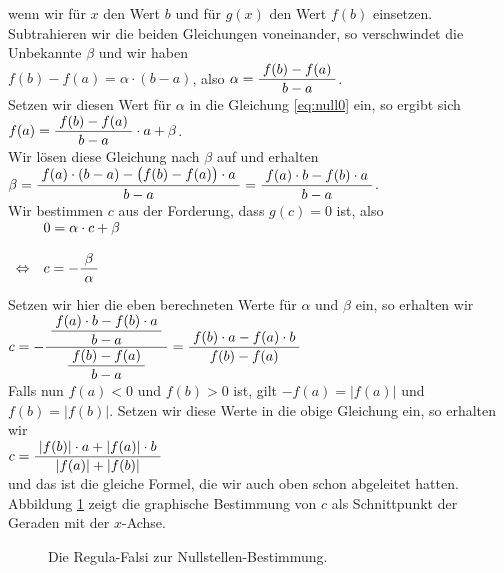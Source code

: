 wenn wir f\"ur $x$ den Wert $b$ und f\"ur $g(x)$ den Wert $f(b)$ einsetzen.  Subtrahieren wir
die beiden Gleichungen voneinander, so verschwindet die Unbekannte $\beta$ und wir haben
\\[0.2cm]
\hspace*{1.3cm}
   $f(b) - f(a) = \alpha \cdot (b-a)$, \quad also \quad $\alpha = \displaystyle\frac{\;\displaystyle f(b) - f(a)\;}{\;\displaystyle b-a\;}$.
\\[0.2cm]
Setzen wir diesen Wert f\"ur $\alpha$ in die Gleichung \ref{eq:null0} ein, so ergibt sich
\\[0.2cm]
\hspace*{1.3cm}
  $f(a) = \displaystyle\frac{\;\displaystyle f(b) - f(a)\;}{\;\displaystyle b-a\;} \cdot a + \beta$.
\\[0.2cm]
Wir l\"osen diese Gleichung nach $\beta$ auf und erhalten
\\[0.2cm]
\hspace*{1.3cm}
 $\beta = \displaystyle\frac{\;\displaystyle f(a)\cdot (b-a) - \bigl(f(b) - f(a)\bigr)\cdot a\;}{\;\displaystyle b-a\;} = \displaystyle\frac{\;\displaystyle f(a)\cdot b - f(b)\cdot a\;}{\;\displaystyle b-a\;}$. 
\\[0.2cm]
 Wir bestimmen $c$ aus der Forderung, dass $g(c) = 0$ ist, also
\\[0.2cm]
\hspace*{1.3cm}
$
\begin{array}[t]{ll}
                & 0 = \alpha \cdot c + \beta \\[0.4cm]
\Leftrightarrow & c = - \displaystyle\frac{\;\displaystyle\beta\;}{\;\displaystyle\alpha\;} \\[0.4cm]
\end{array}
$
\\[0.2cm]
Setzen wir hier die eben berechneten Werte f\"ur $\alpha$ und $\beta$ ein, so erhalten wir
\\[0.2cm]
\hspace*{1.3cm}
$c = - \displaystyle\frac{\;\displaystyle\displaystyle\frac{\;\displaystyle f(a)\cdot b - f(b)\cdot a\;}{\;\displaystyle b-a\;}\;}{\;\displaystyle\displaystyle\frac{\;\displaystyle f(b) - f(a)\;}{\;\displaystyle b-a\;}\;} = 
   \displaystyle\frac{\;\displaystyle f(b)\cdot a - f(a)\cdot b\;}{\;\displaystyle f(b) - f(a)\;}$
\\[0.2cm]
Falls nun $f(a) < 0$ und $f(b) > 0$ ist, gilt $-f(a) = |f(a)|$ und $f(b) = |f(b)|$.
Setzen wir diese Werte in die obige Gleichung ein, so erhalten wir
\\[0.2cm]
\hspace*{1.3cm}
$c  = \displaystyle\frac{\;\displaystyle|f(b)|\cdot a + |f(a)|\cdot b\;}{\;\displaystyle|f(a)| + |f(b)|\;}$
\\[0.2cm] 
und das ist die gleiche Formel, die wir auch oben schon abgeleitet hatten.
Abbildung \ref{fig:regula-falsi} zeigt die graphische Bestimmung von $c$
als Schnittpunkt der Geraden mit der $x$-Achse.
\begin{figure}[!h]
  \centering
   \caption{Die Regula-Falsi zur Nullstellen-Bestimmung.}
  \label{fig:regula-falsi}
\end{figure}


